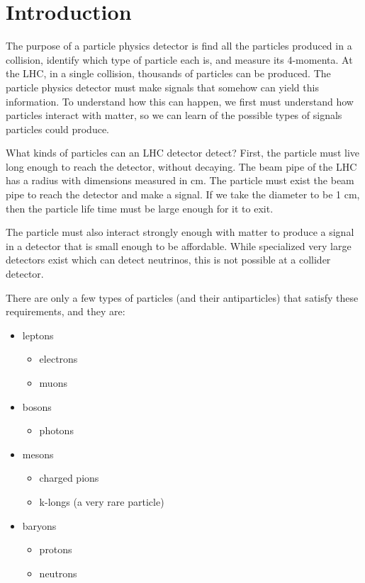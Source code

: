 
\section{Introduction}

The purpose of a particle physics detector is find all the particles produced
in a collision, identify which type of particle each is, and measure its 4-momenta.
At the LHC, in a single collision, thousands of particles can be produced.
The particle physics detector must make signals that somehow can yield this information.
To understand how this can happen, we first must understand how particles interact
with matter, so we can learn of the possible types of signals particles could produce.

What kinds of particles can an LHC detector detect?  First, the particle must live long 
enough to reach the detector, without decaying.  The beam pipe of the LHC has a 
radius with dimensions measured in cm.  The particle must exist the beam pipe to
reach the detector and make a signal.  If we take the diameter to be 1 cm, then
the particle life time must be large enough for it to exit.

The particle must also interact strongly enough with matter to produce a signal in a detector that is small enough to be affordable.  While specialized very large detectors exist which can detect neutrinos, this is not possible at a collider detector.

There are only a few types of particles (and their antiparticles) that satisfy these requirements, and they are:
\begin{itemize}
\item leptons
\begin{itemize}
\item electrons
\item muons
\end{itemize}
\item bosons
\begin{itemize}
\item photons
\end{itemize}
\item mesons
\begin{itemize}
\item charged pions
\item k-longs (a very rare particle)
\end{itemize}
\item baryons
\begin{itemize}
\item protons
\item neutrons
\end{itemize}
\end{itemize}






